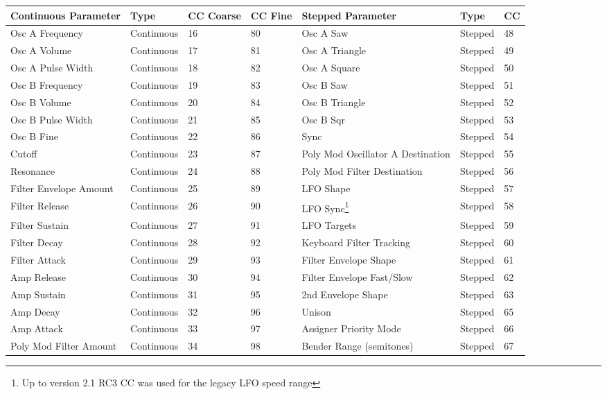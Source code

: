 \begin{longtable}[l]{ p{5cm}|p{2cm}|p{1.5cm}|p{1.5cm}|p{5cm}|p{2cm}|p{1cm}} 
\textbf{Continuous Parameter} & \textbf{Type} & \textbf{ CC Coarse} & \textbf{CC Fine} & \textbf{Stepped Parameter} & \textbf{Type} & \textbf{CC} \\ \hline
Osc A Frequency & Continuous & 16 & 80 & Osc A Saw & Stepped & 48 \\ \hline
Osc A Volume & Continuous & 17 & 81 & Osc A Triangle & Stepped & 49 \\ \hline
Osc A Pulse Width & Continuous & 18 & 82 & Osc A Square & Stepped & 50 \\ \hline
Osc B Frequency & Continuous & 19 & 83 & Osc B Saw & Stepped & 51 \\ \hline
Osc B Volume & Continuous & 20 & 84 & Osc B Triangle & Stepped & 52 \\ \hline
Osc B Pulse Width & Continuous & 21 & 85 & Osc B Sqr & Stepped & 53 \\ \hline
Osc B Fine & Continuous & 22 & 86 & Sync & Stepped & 54 \\ \hline
Cutoff & Continuous & 23 & 87 & Poly Mod Oscillator A Destination & Stepped & 55 \\ \hline
Resonance & Continuous & 24 & 88 & Poly Mod Filter Destination & Stepped & 56 \\ \hline
Filter Envelope Amount & Continuous & 25 & 89 & LFO Shape & Stepped & 57 \\ \hline
Filter Release & Continuous & 26 & 90 & LFO Sync\footnote{Up to version 2.1 RC3 CC was used for the legacy LFO speed range} & Stepped & 58 \\ \hline
Filter Sustain & Continuous & 27 & 91 & LFO Targets & Stepped & 59 \\ \hline
Filter Decay & Continuous & 28 & 92 & Keyboard Filter Tracking & Stepped & 60 \\ \hline
Filter Attack & Continuous & 29 & 93 & Filter Envelope Shape & Stepped & 61 \\ \hline
Amp Release & Continuous & 30 & 94 & Filter Envelope Fast/Slow & Stepped & 62 \\ \hline
Amp Sustain & Continuous & 31 & 95 & 2nd Envelope Shape & Stepped & 63 \\ \hline
Amp Decay & Continuous & 32 & 96 & Unison & Stepped & 65 \\ \hline
Amp Attack & Continuous & 33 & 97 & Assigner Priority Mode & Stepped & 66 \\ \hline
Poly Mod Filter Amount & Continuous & 34 & 98 & Bender Range (semitones) & Stepped & 67 \\ \hline

\end{longtable}
